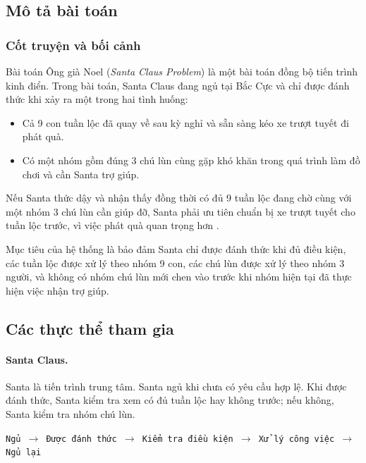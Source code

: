 \subsection{Mô tả bài toán}

\subsubsection*{Cốt truyện và bối cảnh}

Bài toán Ông già Noel (\textit{Santa Claus Problem}) là một bài toán
đồng bộ tiến trình kinh điển. Trong bài toán, Santa Claus đang ngủ tại
Bắc Cực và chỉ được đánh thức khi xảy ra một trong hai tình huống:

\begin{itemize}
\item Cả 9 con tuần lộc đã quay về sau kỳ nghỉ và sẵn sàng kéo xe
trượt tuyết đi phát quà.
\item Có một nhóm gồm đúng 3 chú lùn cùng gặp khó khăn trong quá
trình làm đồ chơi và cần Santa trợ giúp.
\end{itemize}

Nếu Santa thức dậy và nhận thấy đồng thời có đủ 9 tuần lộc đang chờ
cùng với một nhóm 3 chú lùn cần giúp đỡ, Santa phải ưu tiên chuẩn bị xe
trượt tuyết cho tuần lộc trước, vì việc phát quà quan trọng hơn \cite[Sec.~5.5, p.~137]{downey2016}.

Mục tiêu của hệ thống là bảo đảm Santa chỉ được đánh thức khi đủ điều
kiện, các tuần lộc được xử lý theo nhóm 9 con, các chú lùn được xử lý
theo nhóm 3 người, và không có nhóm chú lùn mới chen vào trước khi nhóm
hiện tại đã thực hiện việc nhận trợ giúp.

\subsection{Các thực thể tham gia}

\paragraph{Santa Claus.} Santa là tiến trình trung tâm. Santa ngủ khi chưa có yêu cầu hợp lệ.
Khi được đánh thức, Santa kiểm tra xem có đủ tuần lộc hay không trước;
nếu không, Santa kiểm tra nhóm chú lùn.

\begin{center}
\texttt{Ngủ $\rightarrow$ Được đánh thức $\rightarrow$ Kiểm tra điều kiện
$\rightarrow$ Xử lý công việc $\rightarrow$ Ngủ lại}
\end{center}

